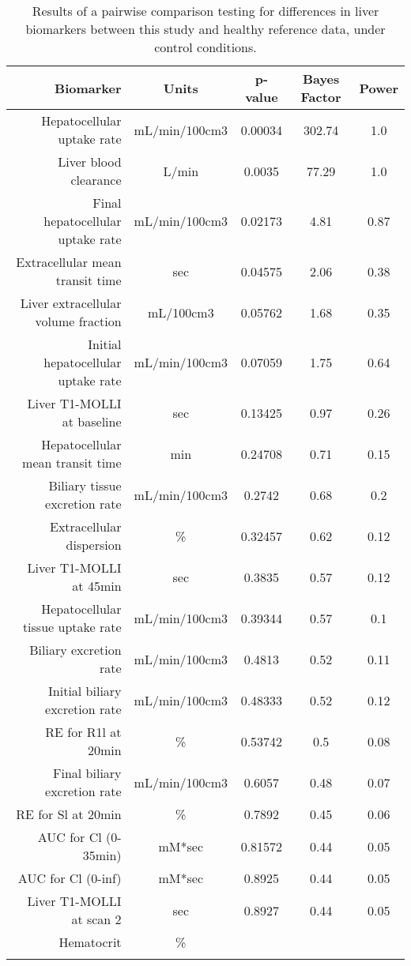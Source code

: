 \documentclass{epflreport}%
\begin{document}
%
\begin{longtable}{rcccc}%
\hline%
Biomarker&Units&p{-}value&Bayes Factor&Power\\%
\hline%
Hepatocellular uptake rate&mL/min/100cm3&0.00034&302.74&1.0\\%
Liver blood clearance&L/min&0.0035&77.29&1.0\\%
Final hepatocellular uptake rate&mL/min/100cm3&0.02173&4.81&0.87\\%
Extracellular mean transit time&sec&0.04575&2.06&0.38\\%
Liver extracellular volume fraction&mL/100cm3&0.05762&1.68&0.35\\%
Initial hepatocellular uptake rate&mL/min/100cm3&0.07059&1.75&0.64\\%
Liver T1{-}MOLLI at baseline&sec&0.13425&0.97&0.26\\%
Hepatocellular mean transit time&min&0.24708&0.71&0.15\\%
Biliary tissue excretion rate&mL/min/100cm3&0.2742&0.68&0.2\\%
Extracellular dispersion&\%&0.32457&0.62&0.12\\%
Liver T1{-}MOLLI at 45min&sec&0.3835&0.57&0.12\\%
Hepatocellular tissue uptake rate&mL/min/100cm3&0.39344&0.57&0.1\\%
Biliary excretion rate&mL/min/100cm3&0.4813&0.52&0.11\\%
Initial biliary excretion rate&mL/min/100cm3&0.48333&0.52&0.12\\%
RE for R1l at 20min&\%&0.53742&0.5&0.08\\%
Final biliary excretion rate&mL/min/100cm3&0.6057&0.48&0.07\\%
RE for Sl at 20min&\%&0.7892&0.45&0.06\\%
AUC for Cl (0{-}35min)&mM*sec&0.81572&0.44&0.05\\%
AUC for Cl (0{-}inf)&mM*sec&0.8925&0.44&0.05\\%
Liver T1{-}MOLLI at scan 2&sec&0.8927&0.44&0.05\\%
Hematocrit&\%&&&\\%
\hline%
\caption{Results of a pairwise comparison testing for differences in liver biomarkers between this study and healthy reference data, under control conditions.} \\%
\end{longtable}%
\end{document}
